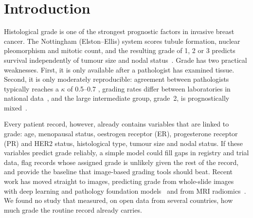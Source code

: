 \section{Introduction}\label{sec:intro}

Histological grade is one of the strongest prognostic factors in invasive breast cancer. The
Nottingham (Elston--Ellis) system scores tubule formation, nuclear pleomorphism and mitotic count,
and the resulting grade of 1, 2 or 3 predicts survival independently of tumour size and nodal
status~\citep{elston1991grade,rakha2008nhg,rakha2010grade}. Grade has two practical weaknesses.
First, it is only available after a pathologist has examined tissue. Second, it is only moderately
reproducible: agreement between pathologists typically reaches a $\kappa$ of 0.5--0.7
\citep{boiesen2000grading,longacre2006interobserver}, grading rates differ between laboratories in
national data~\citep{vandooijeweert2020variation}, and the large intermediate group, grade~2, is
prognostically mixed~\citep{sotiriou2006ggi,vandooijeweert2022grading}.

Every patient record, however, already contains variables that are linked to grade: age, menopausal
status, oestrogen receptor (ER), progesterone receptor (PR) and HER2 status, histological type,
tumour size and nodal status. If these variables predict grade reliably, a simple model could fill
gaps in registry and trial data, flag records whose assigned grade is unlikely given the rest of the
record, and provide the baseline that image-based grading tools should beat. Recent work has moved
straight to images, predicting grade from whole-slide images with deep learning and pathology
foundation models~\citep{wang2022deepgrade,kim2025grade,chen2024uni} and from MRI
radiomics~\citep{wang2022duke,wang2026dcemrigrade}. We found no study that measured, on open data
from several countries, how much grade the routine record already carries.

